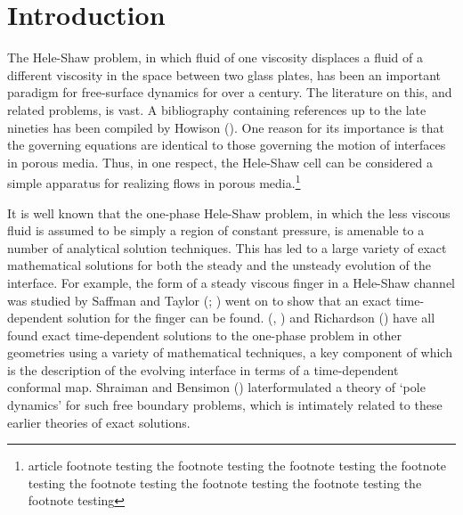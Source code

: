 \documentclass[fleqn]{jleo}
\begin{document}
\section{Introduction}
The Hele-Shaw problem, in which fluid of one viscosity displaces
a fluid of a different viscosity in the space between two glass
plates, has been an important paradigm for free-surface dynamics
for over a century. The literature on this, and related problems,
is vast. A bibliography containing references up to the late nineties
has been compiled by Howison (\citealt{How2}).
One reason for its importance is that the governing equations
are identical to those governing the motion of interfaces in
porous media. Thus,  in one respect, the Hele-Shaw cell can be considered
a simple apparatus for realizing flows in porous media.\footnote{article
footnote testing the footnote testing the footnote testing the footnote testing  the footnote testing the footnote testing  the footnote testing the footnote testing}

It is well known  that the one-phase Hele-Shaw problem, in which
the less viscous fluid is assumed to be simply a region of
constant pressure, is amenable to a number of analytical solution techniques.
This has led to a large variety of exact mathematical
solutions for both the steady and the unsteady evolution of
the interface. For example, the form of a steady viscous
finger in a Hele-Shaw channel was studied by
Saffman and  Taylor (\citealt{ST}; \citealt{PGS2}) went on to show that an
exact time-dependent solution for the finger can be found.
(\citealt{Galin}, \citealt{PK})
and Richardson (\citealt{Rich}) have all found exact time-dependent
solutions to the one-phase problem in other geometries using 
a variety of mathematical techniques, a key component of
which is the description of the evolving interface
in terms of a time-dependent conformal map.
Shraiman and Bensimon (\citealt{BS}) later\break formulated
a theory of `pole dynamics' for such free
boundary problems, which is intimately related
to these earlier theories of exact solutions.
\end{document}
